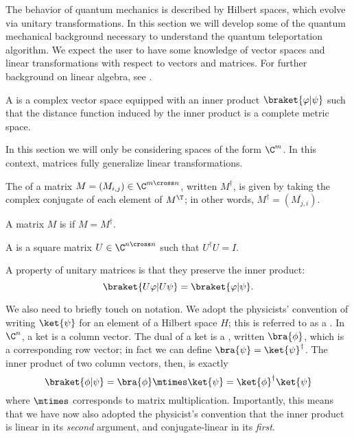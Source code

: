 The behavior of quantum mechanics is described by Hilbert spaces, which
evolve via unitary transformations. In this section we will develop
some of the quantum mechanical background necessary to understand the quantum
teleportation algorithm. We expect the user to have some knowledge of vector spaces and
linear transformations with respect to vectors and matrices. For further
background on linear algebra, see \cite{gallier13}.

\begin{definition}\label{def:hilbert-space}
  A  is a complex vector space equipped with an inner product
  $\braket{\varphi | \psi}$
  such that the distance function induced by the inner product is a complete
  metric space.
\end{definition}

In this section we will only be considering spaces of the form $\C^m$.
In this context, matrices fully generalize linear transformations.

\begin{definition}\label{def:conjugate-transpose}
  The  of a matrix $M = (M_{i,j}) \in \C^{m \cross
  n}$, written $M^\dag$, is given by taking the complex conjugate of each
  element of $M^\T$; in other words, $M^\dag = (\overline{M_{j,i}})$.
\end{definition}

\begin{definition}\label{def:hermitian}
  A matrix $M$ is  if $M = M^\dag$.
\end{definition}

\begin{definition}\label{def:unitary-matrix}
  A  is a square matrix $U \in \C^{n \cross n}$ such that
  $U^\dag U = I$. 
\end{definition}
A property of unitary matrices is that they preserve the inner product:
\[
    \braket{U \varphi | U \psi} = \braket{\varphi | \psi}.
\]

We also need to briefly touch on notation.  We adopt the physicists' convention
of writing $\ket{\psi}$ for an element of a Hilbert space $H$; this is referred
to as a . In $\C^n$, a ket is a column vector.
The dual of a ket is a , written $\bra{\phi}$,
which is a corresponding row vector; in fact we can define $\bra{\psi} = \ket{\psi}^\dag$.
The inner product of two column vectors, then, is exactly
\[ \braket{\phi | \psi} = \bra{\phi} \mtimes \ket{\psi} = \ket{\phi}^\dag \ket{\psi} \]
where $\mtimes$ corresponds to matrix multiplication. Importantly, this means that we
have now also adopted the physicist's convention that the inner product is
linear in its \emph{second} argument, and conjugate-linear in its \emph{first}.

